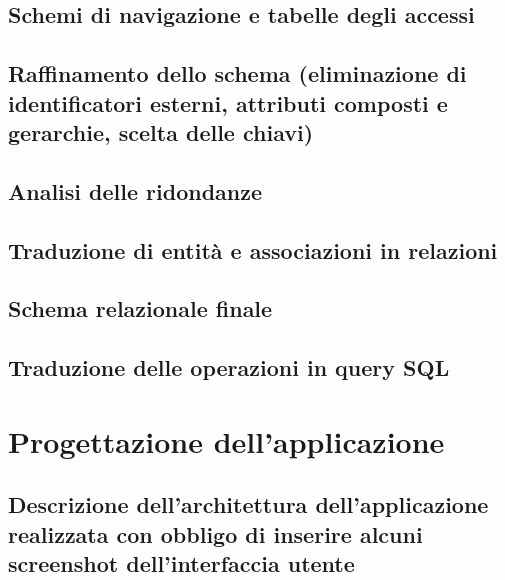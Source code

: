 \documentclass[a4paper,12pt]{report}
\begin{document}
\section{Schemi di navigazione e tabelle degli accessi}
\section{Raffinamento dello schema (eliminazione di identificatori esterni, attributi composti e gerarchie, scelta delle chiavi)}
\section{Analisi delle ridondanze}
\section{Traduzione di entità e associazioni in relazioni}
\section{Schema relazionale finale}
\section{Traduzione delle operazioni in query SQL}
\chapter{Progettazione dell'applicazione}
\section{Descrizione dell'architettura dell'applicazione realizzata con obbligo di inserire alcuni screenshot dell'interfaccia utente}
\end{document}
